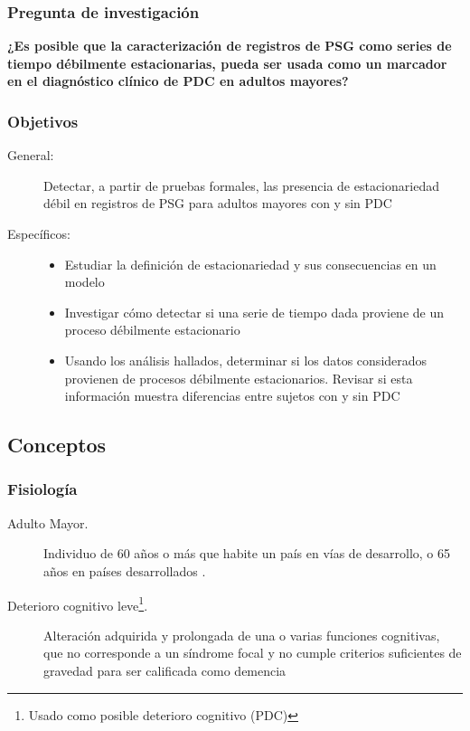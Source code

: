 \documentclass{beamer}
\theoremstyle{definition}
\begin{document}
\begin{frame}\frametitle{Pregunta de investigaci\'on}
\textbf{
¿Es posible que la caracterizaci\'on de registros de PSG como series de tiempo d\'ebilmente 
estacionarias, pueda ser usada como un marcador en el diagn\'ostico cl\'inico de PDC en adultos 
mayores?
}

\end{frame}

\begin{frame}\frametitle{Objetivos}
{\small
\begin{description}
\item[General:]
Detectar, a partir de pruebas formales, las presencia de estacionariedad d\'ebil 
en registros de PSG para adultos mayores con y sin PDC

\item[Espec\'ificos:]
\begin{itemize}
\item Estudiar la definici\'on de estacionariedad y sus consecuencias en un modelo

\item Investigar c\'omo detectar si una serie de tiempo dada proviene de un proceso
d\'ebilmente estacionario

\item Usando los an\'alisis hallados, determinar si los datos considerados provienen de 
procesos débilmente estacionarios.
Revisar si esta informaci\'on muestra diferencias entre sujetos con y sin PDC
\end{itemize}
\end{description}
}
\end{frame}


\subsection{Conceptos}


\subsubsection{Fisiolog\'ia}

\begin{frame}
\begin{description}
\item[Adulto Mayor.] Individuo de 60 a\~nos o m\'as que habite un pa\'is en v\'ias de desarrollo, o 
65 a\~nos en pa\'ises desarrollados \cite{Hita14}.

\item[Deterioro cognitivo leve\footnote{Usado como posible deterioro cognitivo (PDC)}.] 
Alteraci\'on adquirida y prolongada de una o varias funciones cognitivas, que no corresponde a un 
s\'indrome focal y no cumple criterios suficientes de gravedad para ser calificada como demencia 
\cite{Robles02}
\end{description}
\end{frame}
\end{document}
